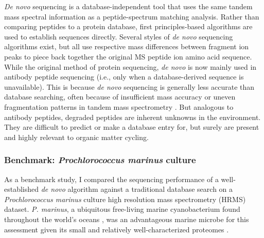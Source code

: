 \documentclass[12pt, letterpaper, twoside]{article}
\begin{document}
\textit{De novo} sequencing is a database-independent tool that uses the same tandem mass spectral information as a peptide-spectrum matching analysis. Rather than comparing peptides to a protein database, first principles-based algorithms are used to establish sequences directly. Several styles of \textit{de novo} sequencing algorithms exist, but all use respective mass differences between fragment ion peaks to piece back together the original MS peptide ion amino acid sequence.  While the original method of protein sequencing, \textit{de novo} is now mainly used in antibody peptide sequencing (i.e., only when a database-derived sequence is unavailable). This is because \textit{de novo} sequencing is generally less accurate than database searching, often because of insufficient mass accuracy \cite{muth_navigating_2015} or uneven fragmentation patterns in tandem mass spectrometry \cite{lu_algorithms_2004}. But analogous to antibody peptides, degraded peptides are inherent unknowns in the environment. They are difficult to predict or make a database entry for, but surely are present and highly relevant to organic matter cycling. 

\subsubsection{Benchmark: \textit{Prochlorococcus marinus} culture}

As a benchmark study, I compared the sequencing performance of a well-established \textit{de novo} algorithm against a traditional database search on a \textit{Prochlorococcus marinus} culture high resolution mass spectrometry (HRMS) dataset. \textit{P. marinus}, a ubiquitous free-living marine cyanobacterium found throughout the world’s oceans \cite{chisholm_novel_1988}, was an advantageous marine microbe for this assessment given its small and relatively well-characterized proteomes \cite{paul_distinct_2010}.
\end{document}
